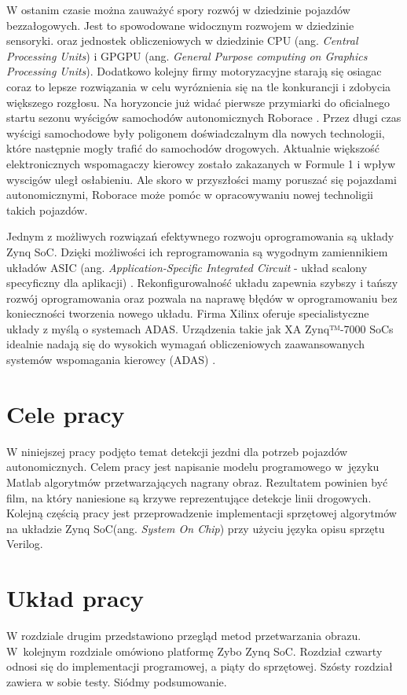 W ostanim czasie można zauważyć spory rozwój w dziedzinie pojazdów bezzałogowych. Jest to spowodowane widocznym rozwojem w dziedzinie sensoryki. oraz jednostek obliczeniowych w dziedzinie CPU (ang. \textit{Central Processing Units}) i GPGPU (ang. \textit{General Purpose computing on Graphics Processing Units}). Dodatkowo kolejny firmy motoryzacyjne starają się osiagac coraz to lepsze rozwiązania w celu wyróznienia się na tle konkurancji i zdobycia większego rozgłosu. Na horyzoncie już widać pierwsze przymiarki do oficialnego startu sezonu wyścigów samochodów autonomicznych Roborace \cite{roborace}. Przez długi czas wyścigi samochodowe były poligonem doświadczalnym dla nowych technologii, które następnie mogły trafić do samochodów drogowych. Aktualnie większość elektronicznych wspomagaczy kierowcy zostało zakazanych w Formule 1 i wpływ wyscigów uległ osłabieniu. Ale skoro w przyszłości mamy poruszać się pojazdami autonomicznymi, Roborace może pomóc w opracowywaniu nowej technoligii takich pojazdów.

Jednym z możliwych rozwiązań efektywnego rozwoju oprogramowania są układy Zynq SoC. Dzięki możliwości ich reprogramowania są wygodnym zamiennikiem układów ASIC (ang. \textit{Application-Specific Integrated Circuit} - układ scalony specyficzny dla aplikacji) \cite{ASIC_zynq}. Rekonfigurowalność układu zapewnia szybszy i tańszy rozwój oprogramowania oraz pozwala na naprawę błędów w oprogramowaniu bez konieczności tworzenia nowego układu.
Firma Xilinx oferuje specialistyczne układy z myślą o systemach ADAS. Urządzenia takie jak XA Zynq™-7000 SoCs idealnie nadają się do wysokich wymagań obliczeniowych zaawansowanych systemów wspomagania kierowcy (ADAS) \cite{xilinx}.


\section{Cele pracy}
W niniejszej pracy podjęto temat detekcji jezdni dla potrzeb pojazdów autonomicznych.  
Celem pracy jest napisanie modelu programowego w~języku Matlab algorytmów przetwarzających nagrany obraz. 
Rezultatem powinien być film, na który naniesione są krzywe reprezentujące detekcje linii drogowych.
Kolejną częścią pracy jest przeprowadzenie implementacji sprzętowej algorytmów na układzie Zynq SoC(ang. \textit{System On Chip}) przy użyciu języka opisu sprzętu Verilog. 
\section{Układ pracy}
W rozdziale drugim przedstawiono przegląd metod przetwarzania obrazu. 
W~kolejnym rozdziale omówiono platformę Zybo Zynq SoC. 
Rozdział czwarty odnosi się do implementacji programowej, a piąty do sprzętowej. Szósty rozdział zawiera w sobie testy. Siódmy podsumowanie. 
